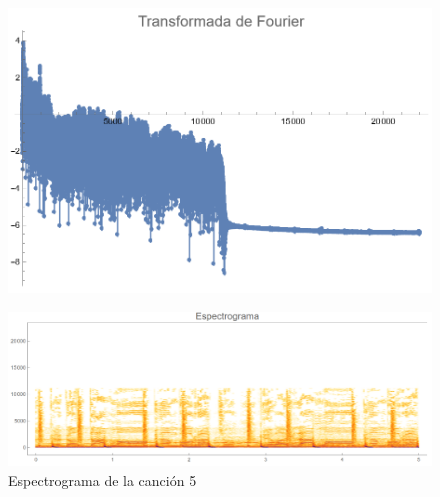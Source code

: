 \documentclass[12pt, letterpaper]{article}
\begin{document}
\begin{figure}[H]
  \centering
  \begin{minipage}{.4\linewidth}
    \centering
    \includegraphics[width=\linewidth]{imgs/Cancion5/transformada.png}
    \label{fig:05a}
  \end{minipage}
  \begin{minipage}{0.07\textwidth}\end{minipage}
  \begin{minipage}{.47\linewidth}
    \centering
    \includegraphics[width=\linewidth]{imgs/Cancion5/espectrograma.png}
    \caption{Espectrograma de la canción 5}
    \label{fig:05i}
  \end{minipage}
\end{figure}
\end{document}
